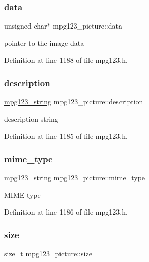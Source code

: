 \subsubsection{\texorpdfstring{data}{data}}
{\footnotesize\ttfamily unsigned char$\ast$ mpg123\+\_\+picture\+::data}

pointer to the image data 

Definition at line 1188 of file mpg123.\+h.

\mbox{\label{structmpg123__picture_a2bd7ec13cbd4cbe673cdccf5a0603a94}} 
\subsubsection{\texorpdfstring{description}{description}}
{\footnotesize\ttfamily \mbox{\hyperlink{structmpg123__string}{mpg123\+\_\+string}} mpg123\+\_\+picture\+::description}

description string 

Definition at line 1185 of file mpg123.\+h.

\mbox{\label{structmpg123__picture_ac36b86a29200e2df5ee60e9d73c231a6}} 
\subsubsection{\texorpdfstring{mime\_type}{mime\_type}}
{\footnotesize\ttfamily \mbox{\hyperlink{structmpg123__string}{mpg123\+\_\+string}} mpg123\+\_\+picture\+::mime\+\_\+type}

M\+I\+ME type 

Definition at line 1186 of file mpg123.\+h.

\mbox{\label{structmpg123__picture_adac68a10895739d1d1772f6340c384eb}} 
\subsubsection{\texorpdfstring{size}{size}}
{\footnotesize\ttfamily size\+\_\+t mpg123\+\_\+picture\+::size}

